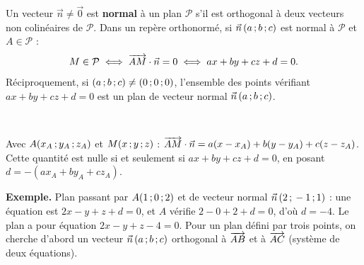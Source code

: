 \noindent
\begin{minipage}[c]{0.58\linewidth}
\begin{theoreme}
\raggedright
Un vecteur $\vec n\neq\vec0$ est \textbf{normal} à un plan $\mathcal{P}$ s'il est orthogonal à deux vecteurs non colinéaires de
$\mathcal{P}$. Dans un repère orthonormé, si $\vec n\,(a\,{;}\, b\,{;}\, c)$ est normal à $\mathcal{P}$ et $A\in\mathcal{P}$ :
\[M\in\mathcal{P}\iff\overrightarrow{AM}\cdot\vec n=0\iff ax+by+cz+d=0.\]
Réciproquement, si $(a\,{;}\, b\,{;}\, c)\neq(0\,{;}\,0\,{;}\,0)$, l'ensemble des points vérifiant $ax+by+cz+d=0$ est un plan de vecteur normal
$\vec n\,(a\,{;}\, b\,{;}\, c)$.
\end{theoreme}
\end{minipage}\hfill
\begin{minipage}[c]{0.38\linewidth}
\centering
{}\\[0.5mm]
\end{minipage}

\begin{demonstration}
Avec $A(x_A\,{;}\, y_A\,{;}\, z_A)$ et $M(x\,{;}\, y\,{;}\, z)$ : $\overrightarrow{AM}\cdot\vec n=a(x-x_A)+b(y-y_A)+c(z-z_A)$. Cette quantité est nulle si et
seulement si $ax+by+cz+d=0$, en posant $d=-(ax_A+by_A+cz_A)$.
\end{demonstration}

\begin{savoirfaire}
\textbf{Exemple.} Plan passant par $A(1\,{;}\,0\,{;}\,2)$ et de vecteur normal $\vec n\,(2\,{;}\,-1\,{;}\,1)$ : une équation est
$2x-y+z+d=0$, et $A$ vérifie $2-0+2+d=0$, d'où $d=-4$. Le plan a pour équation $\boxed{2x-y+z-4=0}$. Pour un plan défini par trois
points, on cherche d'abord un vecteur $\vec n\,(a\,{;}\, b\,{;}\, c)$ orthogonal à $\overrightarrow{AB}$ et à $\overrightarrow{AC}$ (système de deux équations).
\end{savoirfaire}

